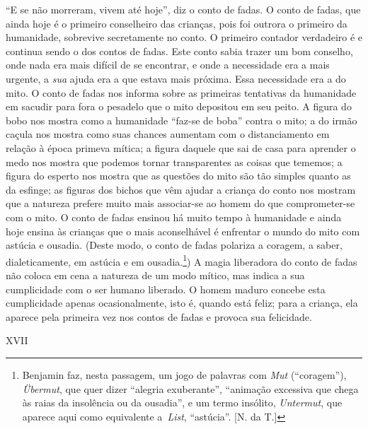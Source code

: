 ``E se não morreram, vivem até hoje'', diz o conto de fadas. O conto de
fadas, que ainda hoje é o primeiro conselheiro das crianças, pois foi
outrora o primeiro da humanidade, sobrevive secretamente no conto. O
primeiro contador verdadeiro é e continua sendo o dos contos de fadas.
Este conto sabia trazer um bom conselho, onde nada era mais difícil de
se encontrar, e onde a necessidade era a mais urgente, a \emph{sua}
ajuda era a que estava mais próxima. Essa necessidade era a do mito. O
conto de fadas nos informa sobre as primeiras tentativas da humanidade
em sacudir para fora o pesadelo que o mito depositou em seu peito. A
figura do bobo nos mostra como a humanidade ``faz-se de boba'' contra o
mito; a do irmão caçula nos mostra como suas chances aumentam com o
distanciamento em relação à época primeva mítica; a figura daquele que
sai de casa para aprender o medo nos mostra que podemos tornar
transparentes as coisas que tememos; a figura do esperto nos mostra que
as questões do mito são tão simples quanto as da esfinge; as figuras dos
bichos que vêm ajudar a criança do conto nos mostram que a natureza
prefere muito mais associar-se ao homem do que comprometer-se com o
mito. O conto de fadas ensinou há muito tempo à humanidade e ainda hoje
ensina às crianças que o mais aconselhável é enfrentar o mundo do mito
com astúcia e ousadia. (Deste modo, o conto de fadas polariza a coragem,
a saber, dialeticamente, em astúcia e em ousadia.\footnote{Benjamin faz,
  nesta passagem, um jogo de palavras com \emph{Mut} (``coragem''),
  \emph{Übermut}, que quer dizer ``alegria exuberante'', ``animação
  excessiva que chega às raias da insolência ou da ousadia'', e um termo
  insólito, \emph{Untermut}, que aparece aqui como equivalente
  a~\emph{List}, ``astúcia''. {[}N. da T.{]}}) A magia liberadora do
conto de fadas não coloca em cena a natureza de um modo mítico, mas
indica a sua cumplicidade com o ser humano liberado. O homem maduro
concebe esta cumplicidade apenas ocasionalmente, isto é, quando está
feliz; para a criança, ela aparece pela primeira vez nos contos de fadas
e provoca sua felicidade.

XVII

